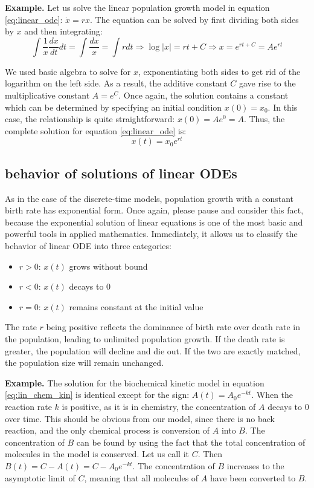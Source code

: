 \documentclass[
]{book}
\providecommand{\tightlist}{%
  \setlength{\itemsep}{0pt}\setlength{\parskip}{0pt}}
\theoremstyle{definition}
\theoremstyle{definition}
\theoremstyle{definition}
\theoremstyle{remark}
\begin{document}
\textbf{Example.} Let us solve the linear population growth model in equation \ref{eq:linear_ode}: \(\dot x = rx\). The equation can be solved by first dividing both sides by \(x\) and then integrating: 
\[ \int \frac{1}{x} \frac{d x}{dt}  dt = \int \frac{dx}{x} = \int r dt \Longrightarrow \log |x| = rt + C  \Longrightarrow  x =  e^{rt+C} = Ae^{rt}\]

We used basic algebra to solve for \(x\), exponentiating both sides to get rid of the logarithm on the left side. As a result, the additive constant \(C\) gave rise to the multiplicative constant \(A=e^C\). Once again, the solution contains a constant which can be determined by specifying an initial condition \(x(0) = x_0\). In this case, the relationship is quite straightforward: \(x(0) = A e^0 = A\). Thus, the complete solution for equation \ref{eq:linear_ode} is:
\[ x(t) = x_0e^{rt}\]

\hypertarget{behavior-of-solutions-of-linear-odes}{%
\subsection{behavior of solutions of linear ODEs}\label{behavior-of-solutions-of-linear-odes}}

As in the case of the discrete-time models, population growth with a constant birth rate has  exponential form. Once again, please pause and consider this fact, because the exponential solution of linear equations is one of the most basic and powerful tools in applied mathematics. Immediately, it allows us to classify the behavior of linear ODE into three categories:

\begin{itemize}
\tightlist
\item
  \(r > 0\): \(x(t)\) grows without bound
\item
  \(r < 0\): \(x(t)\) decays to 0
\item
  \(r = 0\): \(x(t)\) remains constant at the initial value
\end{itemize}

The rate \(r\) being positive reflects the dominance of birth rate over death rate in the population, leading to unlimited population growth. If the death rate is greater, the population will decline and die out. If the two are exactly matched, the population size will remain unchanged.

\textbf{Example.} The solution for the biochemical kinetic model in equation \ref{eq:lin_chem_kin} is identical except for the sign: \(A(t) = A_0 e^{-kt}\). When the reaction rate \(k\) is positive, as it is in chemistry, the concentration of \(A\) decays to 0 over time. This should be obvious from our model, since there is no back reaction, and the only chemical process is conversion of \(A\) into \(B\). The concentration of \(B\) can be found by using the fact that the total concentration of molecules in the model is conserved. Let us call it \(C\). Then \(B(t) = C - A(t) = C- A_0e^{-kt}\). The concentration of \(B\) increases to the asymptotic limit of \(C\), meaning that all molecules of \(A\) have been converted to \(B\).
\end{document}
